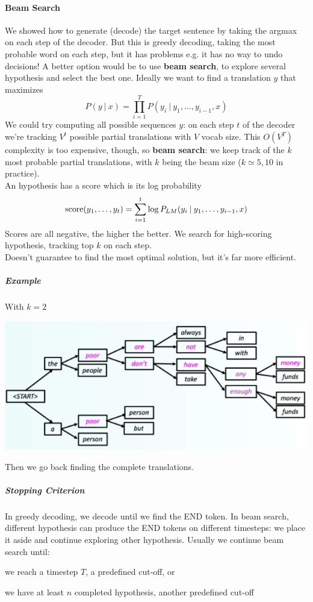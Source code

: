 \documentclass[10pt]{report}
\begin{document}
\paragraph{Beam Search} We showed how to generate (decode) the target sentence by taking the argmax on each step of the decoder. But this is greedy decoding, taking the most probable word on each step, but it has problems e.g. it has no way to undo decisions! A better option would be to use \textbf{beam search}, to explore several hypothesis and select the best one. Ideally we want to find a translation $y$ that maximizes $$P(y\:|\:x) = \prod_{i=1}^T P(y_i\:|\:y_1,\ldots,y_{i-1},x)$$
We could try computing all possible sequences $y$: on each step $t$ of the decoder we're tracking $V^t$ possible partial translations with $V$ vocab size. This $O(V^T)$ complexity is too expensive, though, so \textbf{beam search}: we keep track of the $k$ most probable partial translations, with $k$ being the beam size ($k\simeq 5, 10$ in practice).\\
An hypothesis has a score which is its log probability $$\hbox{score}(y_1,\ldots,y_t) = \sum_{i=1}^t \log P_{LM}(y_i\:|\:y_1,\ldots,y_{i-1},x)$$
Scores are all negative, the higher the better. We search for high-scoring hypothesis, tracking top $k$ on each step.\\
Doesn't guarantee to find the most optimal solution, but it's far more efficient.
\subparagraph{Example} With $k=2$
\begin{center}
	\includegraphics[scale=0.6]{65.png}
\end{center}
Then we go back finding the complete translations.
\subparagraph{Stopping Criterion} In greedy decoding, we decode until we find the END token. In beam search, different hypothesis can produce the END tokens on different timesteps: we place it aside and continue exploring other hypothesis. Usually we continue beam search until:\begin{list}{}{}
	\item we reach a timestep $T$, a predefined cut-off, or
	\item we have at least $n$ completed hypothesis, another predefined cut-off
\end{list}
\end{document}
